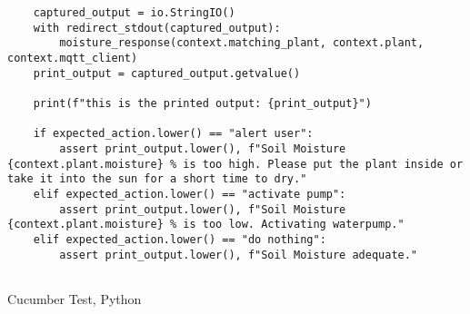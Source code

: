 \begin{longlisting}
\begin{verbatim}
    captured_output = io.StringIO()
    with redirect_stdout(captured_output):
        moisture_response(context.matching_plant, context.plant, context.mqtt_client)
    print_output = captured_output.getvalue()

    print(f"this is the printed output: {print_output}")
    
    if expected_action.lower() == "alert user":
        assert print_output.lower(), f"Soil Moisture {context.plant.moisture} % is too high. Please put the plant inside or take it into the sun for a short time to dry."
    elif expected_action.lower() == "activate pump":
        assert print_output.lower(), f"Soil Moisture {context.plant.moisture} % is too low. Activating waterpump."
    elif expected_action.lower() == "do nothing":
        assert print_output.lower(), f"Soil Moisture adequate."


\end{verbatim}
\caption{Cucumber Test, Python}\label{cde:applicationService}
\end{longlisting}
\newpage